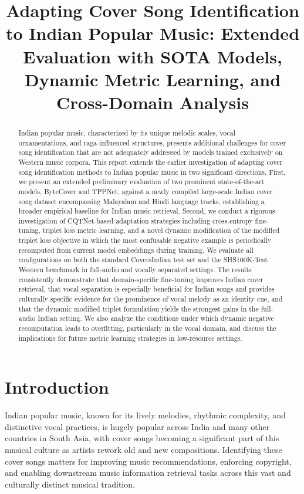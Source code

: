 \documentclass[conference]{IEEEtran}
\title{Adapting Cover Song Identification to Indian Popular Music: Extended Evaluation with SOTA Models, Dynamic Metric Learning, and Cross-Domain Analysis}
\author{
    \IEEEauthorblockN{Rojin Raju \\ Guided by: Dr. Joe Cheri Ross}
    \IEEEauthorblockA{\textit{National Institute of Technology, Calicut}}
}
\begin{document}
\maketitle

\begin{abstract}
Indian popular music, characterized by its unique melodic scales, vocal ornamentations, and raga-influenced structures, presents additional challenges for cover song identification that are not adequately addressed by models trained exclusively on Western music corpora. This report extends the earlier investigation of adapting cover song identification methods to Indian popular music in two significant directions. First, we present an extended preliminary evaluation of two prominent state-of-the-art models, ByteCover and TPPNet, against a newly compiled large-scale Indian cover song dataset encompassing Malayalam and Hindi language tracks, establishing a broader empirical baseline for Indian music retrieval. Second, we conduct a rigorous investigation of CQTNet-based adaptation strategies including cross-entropy fine-tuning, triplet loss metric learning, and a novel dynamic modification of the modified triplet loss objective in which the most confusable negative example is periodically recomputed from current model embeddings during training. We evaluate all configurations on both the standard CoversIndian test set and the SHS100K-Test Western benchmark in full-audio and vocally separated settings. The results consistently demonstrate that domain-specific fine-tuning improves Indian cover retrieval, that vocal separation is especially beneficial for Indian songs and provides culturally specific evidence for the prominence of vocal melody as an identity cue, and that the dynamic modified triplet formulation yields the strongest gains in the full-audio Indian setting. We also analyze the conditions under which dynamic negative recomputation leads to overfitting, particularly in the vocal domain, and discuss the implications for future metric learning strategies in low-resource settings.
\end{abstract}


\section{Introduction}

Indian popular music, known for its lively melodies, rhythmic complexity, and distinctive vocal practices, is hugely popular across India and many other countries in South Asia, with cover songs becoming a significant part of this musical culture as artists rework old and new compositions. Identifying these cover songs matters for improving music recommendations, enforcing copyright, and enabling downstream music information retrieval tasks across this vast and culturally distinct musical tradition.
\end{document}

